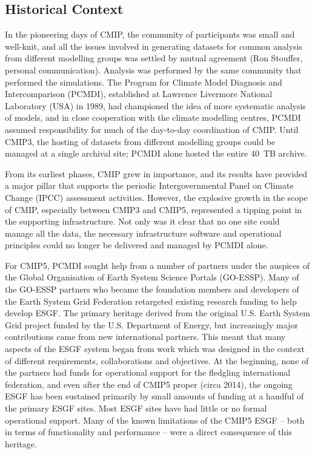 \documentclass[gmd,manuscript]{copernicus}
\begin{document}
\subsection{Historical Context}
\label{sec:history}

In the pioneering days of CMIP, the community of participants was
small and well-knit, and all the issues involved in generating
datasets for common analysis from different modelling groups was
settled by mutual agreement (Ron Stouffer, personal communication).
Analysis was performed by the same community that performed the
simulations. The Program for Climate Model Diagnosis and
Intercomparison (PCMDI), established at Lawrence Livermore National
Laboratory (USA) in 1989, had championed the idea of more systematic
analysis of models, and in close cooperation with the climate
modelling centres, PCMDI assumed responsibility for much of the
day-to-day coordination of CMIP. Until CMIP3, the hosting of datasets
from different modelling groups could be managed at a single archival
site; PCMDI alone hosted the entire 40~TB archive.

From its earliest phases, CMIP grew in importance, and its results
have provided a major pillar that supports the periodic
Intergovernmental Panel on Climate Change (IPCC) assessment
activities. However, the explosive growth in the scope of CMIP,
especially between CMIP3 and CMIP5, represented a tipping point in the
supporting infrastructure. Not only was it clear that no one site
could manage all the data, the necessary infrastructure software and
operational principles could no longer be delivered and managed by
PCMDI alone.

For CMIP5, PCMDI sought help from a number of partners under the
auspices of the Global Organisation of Earth System Science Portals
(GO-ESSP). Many of the GO-ESSP partners who became the foundation
members and developers of the Earth System Grid Federation retargeted
existing research funding to help develop ESGF. The primary heritage
derived from the original U.S. Earth System Grid project funded by the
U.S. Department of Energy, but increasingly major contributions came
from new international partners. This meant that many aspects of the
ESGF system began from work which was designed in the context of
different requirements, collaborations and objectives. At the
beginning, none of the partners had funds for operational support for
the fledgling international federation, and even after the end of
CMIP5 proper (circa 2014), the ongoing ESGF has been sustained
primarily by small amounts of funding at a handful of the primary ESGF
sites. Most ESGF sites have had little or no formal operational
support. Many of the known limitations of the CMIP5 ESGF -- both in
terms of functionality and performance -- were a direct consequence of
this heritage.
\end{document}
